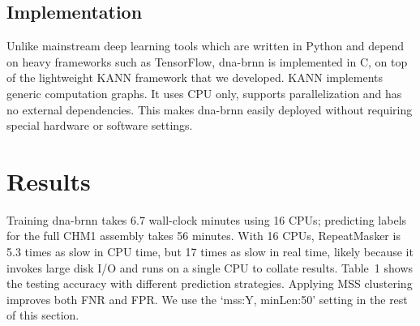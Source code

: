 \documentclass{bioinfo}
\begin{document}
\begin{methods}
\subsection{Implementation}

Unlike mainstream deep learning tools which are written in Python and depend on
heavy frameworks such as TensorFlow, dna-brnn is implemented in C, on top of
the lightweight KANN framework that we developed. KANN implements generic
computation graphs. It uses CPU only, supports parallelization and has no
external dependencies. This makes dna-brnn easily deployed without requiring
special hardware or software settings.


\end{methods}

\section{Results}

Training dna-brnn takes 6.7 wall-clock minutes using 16 CPUs; predicting labels
for the full CHM1 assembly takes 56 minutes. With 16 CPUs, RepeatMasker is 5.3 times
as slow in CPU time, but 17 times as slow in real time, likely because it
invokes large disk I/O and runs on a single CPU to collate results. Table~1 shows the
testing accuracy with different prediction strategies. Applying MSS clustering
improves both FNR and FPR. We use the `mss:Y, minLen:50' setting in the rest of
this section.

\end{document}
